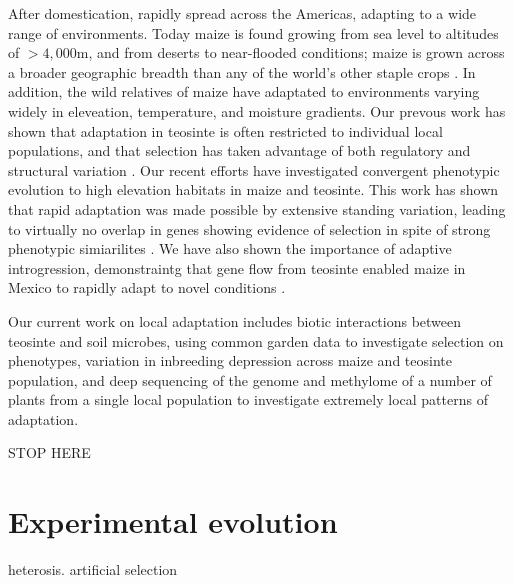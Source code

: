 \documentclass[11pt,letterpaper]{article}
\begin{document}
After domestication, rapidly spread across the Americas, adapting to a wide range of environments. 
Today maize is found growing from sea level to altitudes of $>4,000$m, and from deserts to near-flooded conditions; maize is grown across a broader geographic breadth than any of the world's other staple crops \citep{hake2015genetic}.
In addition, the wild relatives of maize have adaptated to environments varying widely in eleveation, temperature, and moisture gradients. 
Our prevous work has shown that adaptation in teosinte is often restricted to individual local populations, and that selection has taken advantage of both regulatory and structural variation \citep{pyhajarvi2013complex}.
Our recent efforts have investigated convergent phenotypic evolution to high elevation habitats in maize and teosinte.
This work has shown that rapid adaptation was made possible by extensive standing variation, leading to virtually no overlap in genes showing evidence of selection in spite of strong phenotypic simiarilites \citep{Takuno15062015}.
We have also shown the importance of adaptive introgression, demonstraintg that gene flow from teosinte enabled maize in Mexico to rapidly adapt to novel conditions \citep{hufford2013genomic}.

Our current work on local adaptation includes biotic interactions between teosinte and soil microbes, using common garden data to investigate selection on phenotypes, variation in inbreeding depression across maize and teosinte population, and deep sequencing of the genome and methylome of a number of plants from a single local population to investigate extremely local patterns of adaptation.  

{
\color{red}  
\noindent\makebox[\linewidth]{\rule{\linewidth}{0.4pt}}
STOP HERE \\
\noindent\makebox[\linewidth]{\rule{\linewidth}{0.4pt}}
}

\section*{Experimental evolution}

heterosis.
artificial selection
\end{document}
